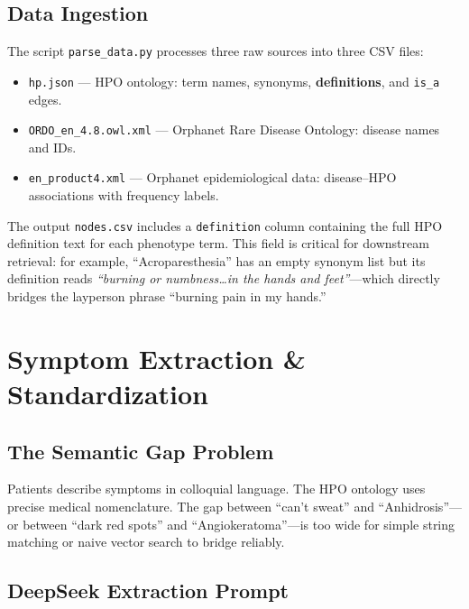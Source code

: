\documentclass[11pt,a4paper]{article}
\begin{document}
\subsection{Data Ingestion}

The script \texttt{parse\_data.py} processes three raw sources into three CSV files:

\begin{itemize}[leftmargin=*]
  \item \texttt{hp.json} — HPO ontology: term names, synonyms, \textbf{definitions}, and \texttt{is\_a} edges.
  \item \texttt{ORDO\_en\_4.8.owl.xml} — Orphanet Rare Disease Ontology: disease names and IDs.
  \item \texttt{en\_product4.xml} — Orphanet epidemiological data: disease–HPO associations with frequency labels.
\end{itemize}

The output \texttt{nodes.csv} includes a \texttt{definition} column containing the full HPO definition text for each phenotype term. This field is critical for downstream retrieval: for example, ``Acroparesthesia'' has an empty synonym list but its definition reads \textit{``burning or numbness\ldots in the hands and feet''}—which directly bridges the layperson phrase ``burning pain in my hands.''

\newpage

\section{Symptom Extraction \& Standardization}

\subsection{The Semantic Gap Problem}

Patients describe symptoms in colloquial language. The HPO ontology uses precise medical nomenclature. The gap between ``can't sweat'' and ``Anhidrosis''—or between ``dark red spots'' and ``Angiokeratoma''—is too wide for simple string matching or naive vector search to bridge reliably.

\subsection{DeepSeek Extraction Prompt}
\end{document}
